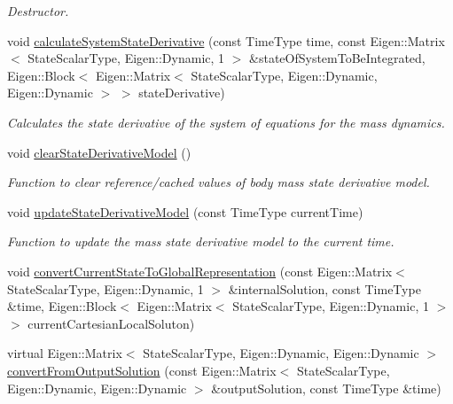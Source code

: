 \begin{DoxyCompactItemize}
\begin{DoxyCompactList}\small\item\em Destructor. \end{DoxyCompactList}\item 
void \hyperlink{classtudat_1_1propagators_1_1BodyMassStateDerivative_a5d23c3bf3aa36a0ffc94e0927051214e}{calculate\+System\+State\+Derivative} (const Time\+Type time, const Eigen\+::\+Matrix$<$ State\+Scalar\+Type, Eigen\+::\+Dynamic, 1 $>$ \&state\+Of\+System\+To\+Be\+Integrated, Eigen\+::\+Block$<$ Eigen\+::\+Matrix$<$ State\+Scalar\+Type, Eigen\+::\+Dynamic, Eigen\+::\+Dynamic $>$ $>$ state\+Derivative)
\begin{DoxyCompactList}\small\item\em Calculates the state derivative of the system of equations for the mass dynamics. \end{DoxyCompactList}\item 
void \hyperlink{classtudat_1_1propagators_1_1BodyMassStateDerivative_a7c37b818e0f9b8a895dc39d374ac4633}{clear\+State\+Derivative\+Model} ()
\begin{DoxyCompactList}\small\item\em Function to clear reference/cached values of body mass state derivative model. \end{DoxyCompactList}\item 
void \hyperlink{classtudat_1_1propagators_1_1BodyMassStateDerivative_a6d8703c45a5f57762d2c7159b8f1c640}{update\+State\+Derivative\+Model} (const Time\+Type current\+Time)
\begin{DoxyCompactList}\small\item\em Function to update the mass state derivative model to the current time. \end{DoxyCompactList}\item 
void \hyperlink{classtudat_1_1propagators_1_1BodyMassStateDerivative_aa924352ed0c6e56afe4c72c45102b3c6}{convert\+Current\+State\+To\+Global\+Representation} (const Eigen\+::\+Matrix$<$ State\+Scalar\+Type, Eigen\+::\+Dynamic, 1 $>$ \&internal\+Solution, const Time\+Type \&time, Eigen\+::\+Block$<$ Eigen\+::\+Matrix$<$ State\+Scalar\+Type, Eigen\+::\+Dynamic, 1 $>$ $>$ current\+Cartesian\+Local\+Soluton)
\item 
virtual Eigen\+::\+Matrix$<$ State\+Scalar\+Type, Eigen\+::\+Dynamic, Eigen\+::\+Dynamic $>$ \hyperlink{classtudat_1_1propagators_1_1BodyMassStateDerivative_a02810a56236b1c338f869e00b584b8b1}{convert\+From\+Output\+Solution} (const Eigen\+::\+Matrix$<$ State\+Scalar\+Type, Eigen\+::\+Dynamic, Eigen\+::\+Dynamic $>$ \&output\+Solution, const Time\+Type \&time)

\end{DoxyCompactItemize}
